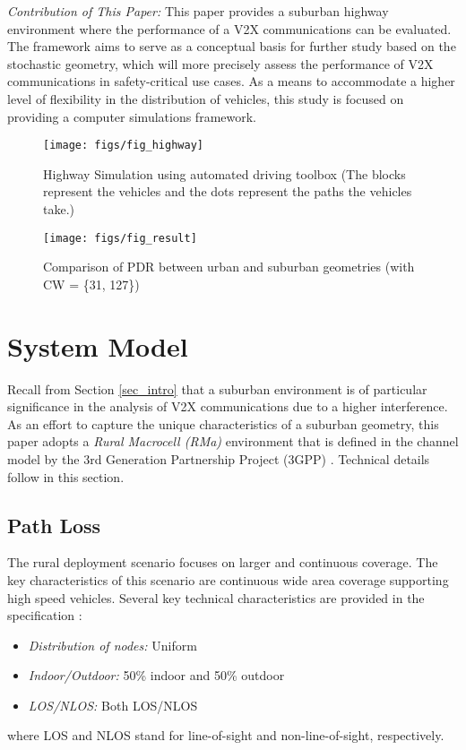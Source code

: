 \documentclass[journal]{IEEEtran}
\begin{document}
\textit{Contribution of This Paper:} This paper provides a suburban highway environment where the performance of a V2X communications can be evaluated. The framework aims to serve as a conceptual basis for further study based on the stochastic geometry, which will more precisely assess the performance of V2X communications in safety-critical use cases. As a means to accommodate a higher level of flexibility in the distribution of vehicles, this study is focused on providing a computer simulations framework.


\begin{figure*}
\centering
\texttt{[image: figs/fig\_highway]}
\caption{Highway Simulation using automated driving toolbox (The blocks represent the vehicles and the dots represent the paths the vehicles take.)}
\label{fig_highway}
\end{figure*}



\begin{figure*}
\centering
\texttt{[image: figs/fig\_result]}
\caption{Comparison of PDR between urban and suburban geometries (with CW = \{31, 127\})}
\label{fig_result}
\end{figure*}



\section{System Model}\label{sec_model}
Recall from Section \ref{sec_intro} that a suburban environment is of particular significance in the analysis of V2X communications due to a higher interference. As an effort to capture the unique characteristics of a suburban geometry, this paper adopts a \textit{Rural Macrocell (RMa)} environment that is defined in the channel model by the 3rd Generation Partnership Project (3GPP) \cite{tr38901}. Technical details follow in this section.

\subsection{Path Loss}
The rural deployment scenario focuses on larger and continuous coverage. The key characteristics of this scenario are
continuous wide area coverage supporting high speed vehicles. Several key technical characteristics are provided in the specification \cite{tr38901}:
\begin{itemize}
\item \textit{Distribution of nodes:} Uniform
\item \textit{Indoor/Outdoor:} 50\% indoor and 50\% outdoor
\item \textit{LOS/NLOS:} Both LOS/NLOS
\end{itemize}
where LOS and NLOS stand for line-of-sight and non-line-of-sight, respectively.
\end{document}
